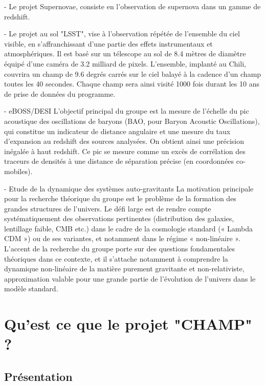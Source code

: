 \documentclass[french,a4paper,12pt]{report}
\begin{document}
\begin{itemize}
			- Le projet Supernovae, consiste en l'observation de supernova dans un gamme de redshift.
			
			- Le projet au sol "LSST", vise à l'observation répétée de l'ensemble du ciel visible, en s'affranchissant d'une partie des effets instrumentaux et atmosphériques. Il est basé sur un télescope au sol de 8.4 mètres de diamètre équipé d'une caméra de 3.2 milliard de pixels. L'ensemble, implanté au Chili, couvrira un champ de 9.6 degrés carrés sur le ciel balayé à la cadence d'un champ toutes les 40 secondes. Chaque champ sera ainsi visité 1000 fois durant les 10 ans de prise de données du programme.
			
			- eBOSS/DESI
			L’objectif principal du groupe est la mesure de l’échelle du pic acoustique des oscillations de baryons (BAO, pour Baryon Acoustic Oscillations), qui constitue un indicateur de distance angulaire et une mesure du taux d’expansion au redshift des sources analysées. On obtient ainsi une précision inégalée à haut redshift. Ce pic se mesure comme un excès de corrélation des traceurs de densités à une distance de séparation précise (en coordonnées co-mobiles).
			
			- Etude de la dynamique des systèmes auto-gravitants
			La motivation principale pour la recherche théorique du groupe est le problème de la formation des grandes structures de l’univers. Le défi large est de rendre compte systématiquement des observations pertinentes (distribution des galaxies, lentillage faible, CMB etc.) dans le cadre de la cosmologie standard (« Lambda CDM ») ou de ses variantes, et notamment dans le régime « non-linéaire ». L’accent de la recherche du groupe porte sur des questions fondamentales théoriques dans ce contexte, et il s’attache notamment à comprendre la dynamique non-linéaire de la matière purement gravitante et non-relativiste, approximation valable pour une grande partie de l’évolution de l’univers dans le modèle standard.		
		  	
  \end{itemize}
  
    
%
%
\part{Qu'est ce que le projet "CHAMP" ?}
  \chapter{Présentation}
  
\end{document}

